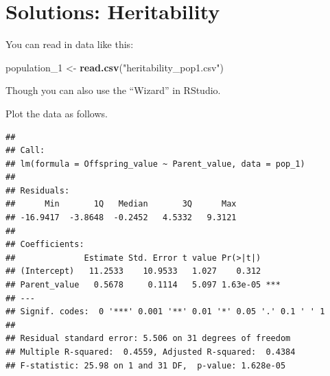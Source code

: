 \documentclass[
  a4paper]{book}
\newenvironment{Shaded}{\begin{snugshade}}{\end{snugshade}}
\newcommand{\AttributeTok}[1]{\textcolor[rgb]{0.13,0.29,0.53}{#1}}
\newcommand{\CommentTok}[1]{\textcolor[rgb]{0.56,0.35,0.01}{\textit{#1}}}
\newcommand{\FunctionTok}[1]{\textcolor[rgb]{0.13,0.29,0.53}{\textbf{#1}}}
\newcommand{\NormalTok}[1]{#1}
\newcommand{\OtherTok}[1]{\textcolor[rgb]{0.56,0.35,0.01}{#1}}
\newcommand{\SpecialCharTok}[1]{\textcolor[rgb]{0.81,0.36,0.00}{\textbf{#1}}}
\newcommand{\StringTok}[1]{\textcolor[rgb]{0.31,0.60,0.02}{#1}}
\begin{document}
\hypertarget{solutions-heritability}{%
\section{Solutions: Heritability}\label{solutions-heritability}}

You can read in data like this:

\begin{Shaded}
\begin{Highlighting}[]
\NormalTok{population\_1 }\OtherTok{\textless{}{-}} \FunctionTok{read.csv}\NormalTok{(}\StringTok{"heritability\_pop1.csv"}\NormalTok{)}
\end{Highlighting}
\end{Shaded}

Though you can also use the ``Wizard'' in RStudio.

Plot the data as follows.

\begin{Shaded}
\end{Shaded}

\begin{verbatim}
## 
## Call:
## lm(formula = Offspring_value ~ Parent_value, data = pop_1)
## 
## Residuals:
##      Min       1Q   Median       3Q      Max 
## -16.9417  -3.8648  -0.2452   4.5332   9.3121 
## 
## Coefficients:
##              Estimate Std. Error t value Pr(>|t|)    
## (Intercept)   11.2533    10.9533   1.027    0.312    
## Parent_value   0.5678     0.1114   5.097 1.63e-05 ***
## ---
## Signif. codes:  0 '***' 0.001 '**' 0.01 '*' 0.05 '.' 0.1 ' ' 1
## 
## Residual standard error: 5.506 on 31 degrees of freedom
## Multiple R-squared:  0.4559, Adjusted R-squared:  0.4384 
## F-statistic: 25.98 on 1 and 31 DF,  p-value: 1.628e-05
\end{verbatim}
\end{document}
